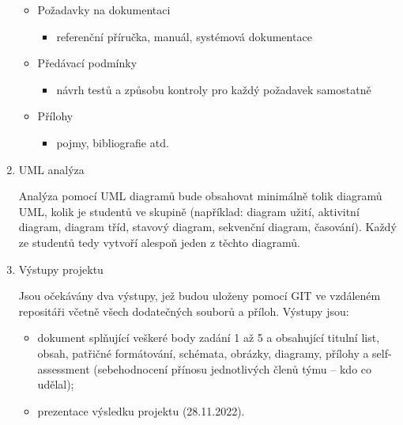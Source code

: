 \begin{enumerate}[label=\arabic*)]
\begin{itemize}
        \item Požadavky na dokumentaci
        \begin{itemize}[\tiny {}]
            \item referenční příručka, manuál, systémová dokumentace
        \end{itemize}

        \item Předávací podmínky
        \begin{itemize}[\tiny {}]
            \item návrh testů a způsobu kontroly pro každý požadavek samostatně
        \end{itemize}

        \item Přílohy
        \begin{itemize}[\tiny {}]
            \item pojmy, bibliografie atd.
        \end{itemize}
    \end{itemize}

    \item UML analýza
    
    Analýza pomocí UML diagramů bude obsahovat minimálně tolik diagramů UML, kolik je studentů ve skupině (například: diagram užití, aktivitní diagram, diagram tříd, stavový diagram, sekvenční diagram, časování). Každý ze studentů tedy vytvoří alespoň jeden z těchto diagramů.

    \item Výstupy projektu
    
    Jsou očekávány dva výstupy, jež budou uloženy pomocí GIT ve vzdáleném repositáři včetně všech dodatečných souborů a příloh. Výstupy jsou:
    \begin{itemize}
        \item dokument splňující veškeré body zadání 1 až 5 a obsahující titulní list, obsah, patřičné
        formátování, schémata, obrázky, diagramy, přílohy a self-assessment (sebehodnocení přínosu
        jednotlivých členů týmu – kdo co udělal);
        \item prezentace výsledku projektu (28.11.2022).   
    \end{itemize}

\end{enumerate} 



\endinput
